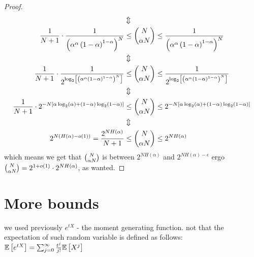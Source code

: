 \begin{lemma}
\begin{proof}
\begin{align*}
 & \Updownarrow\\
\frac{1}{N+1}\cdot\frac{1}{\left(\alpha^{\alpha}\left(1-\alpha\right)^{1-\alpha}\right)^{N}} & \le\binom{N}{\alpha N}\le\frac{1}{\left(\alpha^{\alpha}\left(1-\alpha\right)^{1-\alpha}\right)^{N}}\\
 & \Updownarrow\\
\frac{1}{N+1}\cdot\frac{1}{2^{\log_{2}\left[\left(\alpha^{\alpha}\left(1-\alpha\right)^{1-\alpha}\right)^{N}\right]}} & \le\binom{N}{\alpha N}\le\frac{1}{2^{\log_{2}\left[\left(\alpha^{\alpha}\left(1-\alpha\right)^{1-\alpha}\right)^{N}\right]}}\\
 & \Updownarrow\\
\frac{1}{N+1}\cdot2^{-N\left[\alpha\log_{2}\left(\alpha\right)+\left(1-\alpha\right)\log_{2}\left(1-\alpha\right)\right]} & \le\binom{N}{\alpha N}\le2^{-N\left[\alpha\log_{2}\left(\alpha\right)+\left(1-\alpha\right)\log_{2}\left(1-\alpha\right)\right]}\\
 & \Updownarrow\\
2^{N\left(H\left(\alpha\right)-o\left(1\right)\right)}=\frac{2^{NH\left(\alpha\right)}}{N+1} & \le\binom{N}{\alpha N}\le2^{NH\left(\alpha\right)}
\end{align*}
 which means we get that $\binom{N}{\alpha N}$ is between $2^{NH\left(\alpha\right)}$
and $2^{NH\left(\alpha\right)-\epsilon}$ ergo $\binom{N}{\alpha N}=2^{1+o\left(1\right)}\cdot2^{NH\left(\alpha\right)}$,
as wanted.
\end{proof}
\end{lemma}


\section{More bounds}
\begin{remark}
we used previously $e^{tX}$ - the moment generating function. not
that the expectation of such random variable is defined as follows:
$\mathbb{E}\left[e^{tX}\right]=\sum_{j=0}^{\infty}\frac{t^{j}}{j!}\mathbb{E}\left[X^{j}\right]$
\end{remark}


